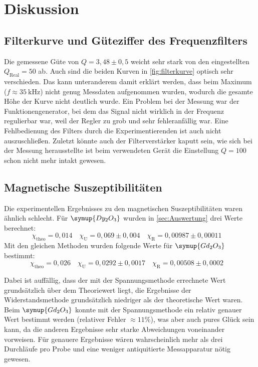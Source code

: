\section{Diskussion}
\label{sec:Diskussion}

\subsection{Filterkurve und Güteziffer des Frequenzfilters}
\label{sec:Filterkurve und Güteziffer des Frequenzfilters}

Die gemessene Güte von $Q = 3,48 \pm 0,5$ weicht sehr stark von den eingestellten 
$Q_\text{Real} = 50$ ab. Auch sind die beiden Kurven in \autoref{fig:filterkurve} optisch
sehr verschieden. Das kann unteranderem damit erklärt werden, dass beim Maximum ($f
\approx \SI{35}{\kilo\hertz}$) nicht genug Messdaten aufgenommen wurden, wodurch die
gesamte Höhe der Kurve nicht deutlich wurde. Ein Problem bei der Messung war der
Funktionengenerator, bei dem das Signal nicht wirklich in der Frequenz regulierbar war,
weil der Regler zu grob und sehr fehleranfällig war. Eine Fehlbedienung des Filters durch die
Experimentierenden ist auch nicht auszuschließen. Zuletzt könnte auch der Filterverstärker
kaputt sein, wie sich bei der Messung herausstellte ist beim verwendeten Gerät die Einstellung 
$Q = 100$ schon nicht mehr intakt gewesen.

\subsection{Magnetische Suszeptibilitäten}
\label{sec:Magnetische Suszeptibilitäten}

Die experimentellen Ergebnisses zu den magnetischen Suszeptibilitäten waren ähnlich
schlecht. Für $\symup{Dy_2O_3}$ wurden in \autoref{sec:Auswertung} drei Werte berechnet:
\begin{equation}
	\label{eqn:ergebnisse-Dy2O3}
	\chi_\text{theo} = 0,014
	\quad
	\chi_\text{U} = 0,069 \pm 0,004
	\quad
	\chi_\text{R} = 0,00987 \pm 0,00011
	\quad
\end{equation}
Mit den gleichen Methoden wurden folgende Werte für $\symup{Gd_2O_3}$ bestimmt:
\begin{equation}
	\label{eqn:ergebnisse-Gd2O3}
	\chi_\text{theo} = 0,026
	\quad
	\chi_\text{U} = 0,0292 \pm 0,0017
	\quad
	\chi_\text{R} = 0,00508 \pm 0,0002
	\quad
\end{equation}

Dabei ist auffällig, dass der mit der Spannungsmethode errechnete Wert grundsätzlich 
über dem Theoriewert liegt, die Ergebnisse der Widerstandsmethode grundsätzlich niedriger
als der theoretische Wert waren. Beim $\symup{Gd_2O_3}$ konnte mit der Spannungsmethode
ein relativ genauer Wert bestimmt werden (relativer Fehler $\approx 11\%$),
was aber auch pures Glück sein kann, da die anderen Ergebnisse sehr starke
Abweichungen voneinander vorweisen. Für genauere Ergebnisse wären
wahrscheinlich mehr als drei Durchläufe pro Probe und eine weniger antiquitierte Messapparatur 
nötig gewesen.

